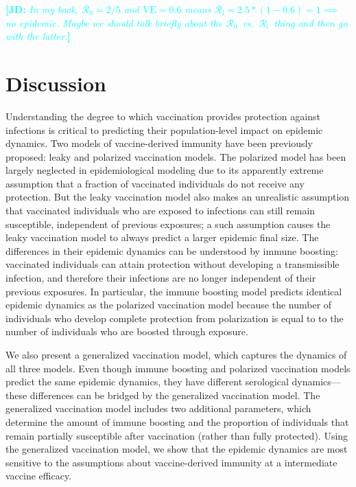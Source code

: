 \documentclass[12pt]{article}
\newcommand{\comment}{\showcomment}
\newcommand{\showcomment}[3]{\textcolor{#1}{\textbf{[#2: }\textsl{#3}\textbf{]}}}
\newcommand{\jd}[1]{\comment{cyan}{JD}{#1}}
\newcommand{\Rx}[1]{\ensuremath{{\mathcal R}_{#1}}\xspace}
\newcommand{\Ro}{\Rx{0}}
\newcommand{\Ri}{\Rx{\mathrm{i}}}
\newcommand{\VE}{\ensuremath{\mathrm{VE}}}
\begin{document}
\jd{In my book, $\Ro = 2/5$ and $\VE = 0.6$ means $\Ri=2.5*(1-0.6)=1\implies$ no epidemic. Maybe we should talk briefly about the \Ro\ vs.~\Ri\ thing  and then go with the latter.}

\section*{Discussion}

Understanding the degree to which vaccination provides protection against infections is critical to predicting their population-level impact on epidemic dynamics.
Two models of vaccine-derived immunity have been previously proposed: leaky and polarized vaccination models.
The polarized model has been largely neglected in epidemiological modeling due to its apparently extreme assumption that a fraction of vaccinated individuals do not receive any protection. 
But the leaky vaccination model also makes an unrealistic assumption that vaccinated individuals who are exposed to infections can still remain susceptible, independent of previous exposures; 
a such assumption causes the leaky vaccination model to always predict a larger epidemic final size.
The differences in their epidemic dynamics can be understood by immune boosting: vaccinated individuals can attain protection without developing a transmissible infection, and therefore their infections are no longer independent of their previous exposures.
In particular, the immune boosting model predicts identical epidemic dynamics as the polarized vaccination model because the number of individuals who develop complete protection from polarization is equal to to the number of individuals who are boosted through exposure.

We also present a generalized vaccination model, which captures the dynamics of all three models.
Even though immune boosting and polarized vaccination models predict the same epidemic dynamics, they have different serological dynamics---these differences can be bridged by the generalized vaccination model.
The generalized vaccination model includes two additional parameters, which determine the amount of immune boosting and the proportion of individuals that remain partially susceptible after vaccination (rather than fully protected).
Using the generalized vaccination model, we show that the epidemic dynamics are most sensitive to the assumptions about vaccine-derived immunity at a intermediate vaccine efficacy.
\end{document}
